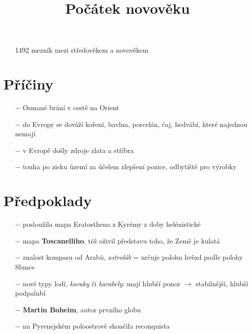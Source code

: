 \documentclass{article}
\title{\vspace{-2cm}Počátek novověku\vspace{-1.7cm}}
\date{}
\author{}
\begin{document}
\maketitle

\begin{itemize}
    \vspace{-0.5em}
    \setlength\itemsep{0.15em}
    \item[1492] mezník mezi středověkem a novověkem
\end{itemize}

\section*{Příčiny}
\begin{itemize}
    \vspace{-0.5em}
    \setlength\itemsep{0.15em}
    \item[$-$] Osmané brání v cestě na Orient
    \item[$-$] do Evropy se dováží koření, bavlna, porcelán, čaj, hedvábí, které najednou nemají
    \item[$-$] v Evropě došly zdroje zlata a stříbra
    \item[$-$] touha po zisku území za účelem zlepšení pozice, odbytiště pro výrobky
\end{itemize}

\section*{Předpoklady}
\begin{itemize}
    \vspace{-0.5em}
    \setlength\itemsep{0.15em}
    \item[$-$] posloužila mapa Eratosthena z Kyrémy z doby helénistické
    \item[$-$] mapa \textbf{Toscanelliho}, též oživil představu toho, že Země je kulatá
    \item[$-$] znalost kompasu od Arabů, \textit{astroláb} = určuje polohu hvězd podle polohy Slunce
    \item[$-$] nové typy lodí, \textit{karaky} či \textit{karabely}: mají hlubší ponor $\rightarrow$ stabilnější, hlubší podpalubí
    \item[$-$] \textbf{Martin Boheim}, autor prvního globu
    \item[$-$] na Pyrenejském poloostrově skončila reconquista
\end{itemize}
\end{document}
